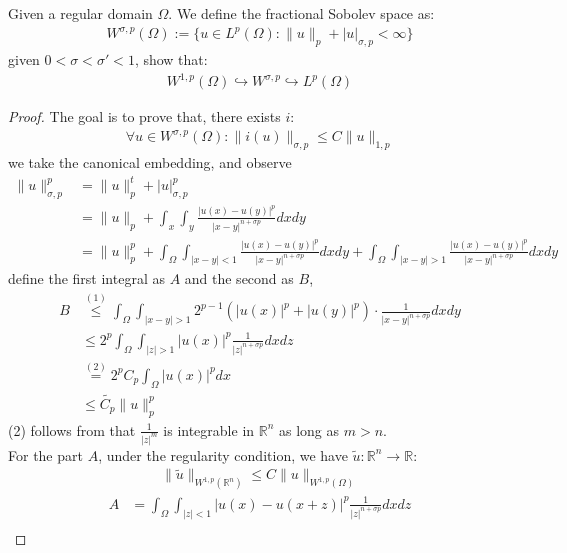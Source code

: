 \begin{theorem}
Given a regular domain $\Omega$. We define the fractional Sobolev space as:
\begin{align*}
	W^{\sigma, p}(\Omega):= \{ u \in L^p(\Omega) : \|u\|_p + |u|_{\sigma, p} < \infty \}
\end{align*}
given $0 < \sigma < \sigma' < 1$,  show that:
\begin{align*}
	W^{1, p}(\Omega) \hookrightarrow W^{\sigma, p} \hookrightarrow L^p(\Omega)
\end{align*}
\end{theorem}
\begin{proof}
	The goal is to prove that, there exists $i$:
	\begin{align*}
		\forall u \in W^{\sigma, p}(\Omega): \|i(u)\|_{\sigma, p} \leq C
		\|u\|_{1, p}
  	\end{align*}
  	we take the canonical embedding, and observe
  	\begin{align*}
  		\|u\|_{\sigma, p}^p &= \|u\|_p^t + |u|_{\sigma, p}^p\\
  		&= \|u\|_p + \int_x \int_y  \frac{|u(x) - u(y)|^p}{|x - y|^{n + \sigma p}} dx dy\\
  		&= \|u\|_p^p + \int_{\Omega}\int_{|x-y| < 1} \frac{|u(x) - u(y)|^p}{|x - y|^{n +\sigma p}} dx dy + \int_{\Omega} \int_{|x-y| > 1}\frac{|u(x) - u(y)|^p}{|x - y|^{n +\sigma p}} dx dy
  	\end{align*}
  	define the first integral as $A$ and the second as $B$, 
  	\begin{align*}
  	 B & \overset{(1)}{\leq} \int_\Omega \int_{|x -y| > 1} 2^{p-1} (|u(x)|^p + |u(y)|^p) \cdot \frac{1}{|x - y|^{n + \sigma p}} dxdy\\
  	   &\leq 2^p \int_\Omega \int_{|z| > 1} |u(x)|^p \frac{1}{|z|^{n + \sigma p}}dx dz\\
  	   &\overset{(2)}{=} 2^p C_p \int_{\Omega} |u(x)|^p dx  \\
  		   &\leq \tilde{C_p} \|u\|_p^p
  	\end{align*}
  	(2) follows from that $\frac{1}{|z|^m}$ is integrable in $\mathbb{R}^n$ as long as $m > n$.\\
  	For the part $A$, under the regularity condition, we have $\tilde{u}: \mathbb{R}^n \rightarrow \mathbb{R}$:
  	\begin{align*}
  		\|\tilde{u}\|_{W^{1, p}(\mathbb{R}^n)} \leq C\|u\|_{W^{1, p}(\Omega)}
  	\end{align*}
  	\begin{align*}
  		A &= \int_\Omega \int_{|z| < 1} |u(x) - u(x + z)|^p \frac{1}{|z|^{n + \sigma p}} dx dz\\

\end{align*}
\end{proof}
